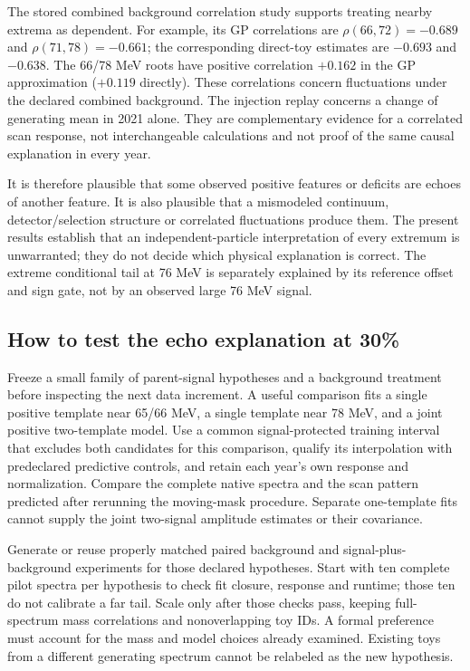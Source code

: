 The stored combined background correlation study supports treating nearby extrema as dependent. For example, its GP correlations are $\rho(66,72)=-0.689$ and $\rho(71,78)=-0.661$; the corresponding direct-toy estimates are $-0.693$ and $-0.638$. The 66/78 MeV roots have positive correlation $+0.162$ in the GP approximation ($+0.119$ directly). These correlations concern fluctuations under the declared combined background. The injection replay concerns a change of generating mean in 2021 alone. They are complementary evidence for a correlated scan response, not interchangeable calculations and not proof of the same causal explanation in every year.

It is therefore plausible that some observed positive features or deficits are echoes of another feature. It is also plausible that a mismodeled continuum, detector/selection structure or correlated fluctuations produce them. The present results establish that an independent-particle interpretation of every extremum is unwarranted; they do not decide which physical explanation is correct. The extreme conditional tail at 76 MeV is separately explained by its reference offset and sign gate, not by an observed large 76 MeV signal.

\subsection*{How to test the echo explanation at 30\%}
Freeze a small family of parent-signal hypotheses and a background treatment before inspecting the next data increment. A useful comparison fits a single positive template near 65/66 MeV, a single template near 78 MeV, and a joint positive two-template model. Use a common signal-protected training interval that excludes both candidates for this comparison, qualify its interpolation with predeclared predictive controls, and retain each year's own response and normalization. Compare the complete native spectra and the scan pattern predicted after rerunning the moving-mask procedure. Separate one-template fits cannot supply the joint two-signal amplitude estimates or their covariance.

Generate or reuse properly matched paired background and signal-plus-background experiments for those declared hypotheses. Start with ten complete pilot spectra per hypothesis to check fit closure, response and runtime; those ten do not calibrate a far tail. Scale only after those checks pass, keeping full-spectrum mass correlations and nonoverlapping toy IDs. A formal preference must account for the mass and model choices already examined. Existing toys from a different generating spectrum cannot be relabeled as the new hypothesis.

